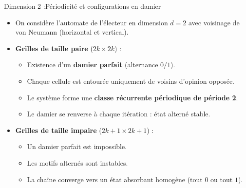 \documentclass{beamer}
\begin{document}
\begin{frame}{Dimension 2 :Périodicité et configurations en damier}
\begin{itemize}
  \item On considère l’automate de l’électeur en dimension $d=2$ avec voisinage de von Neumann (horizontal et vertical).
  \item \textbf{Grilles de taille paire} ($2k \times 2k$) :
  \begin{itemize}
    \item Existence d’un \textbf{damier parfait} (alternance $0/1$).
    \item Chaque cellule est entourée uniquement de voisins d’opinion opposée.
    \item Le système forme une \textbf{classe récurrente périodique de période 2}.
    \item Le damier se renverse à chaque itération : état alterné stable.
  \end{itemize}
  \item \textbf{Grilles de taille impaire} ($2k+1 \times 2k+1$) :
  \begin{itemize}
    \item Un damier parfait est impossible.
    \item Les motifs alternés sont instables.
    \item La chaîne converge vers un état absorbant homogène (tout $0$ ou tout $1$).
  \end{itemize}
\end{itemize}
\end{frame}
\end{document}
